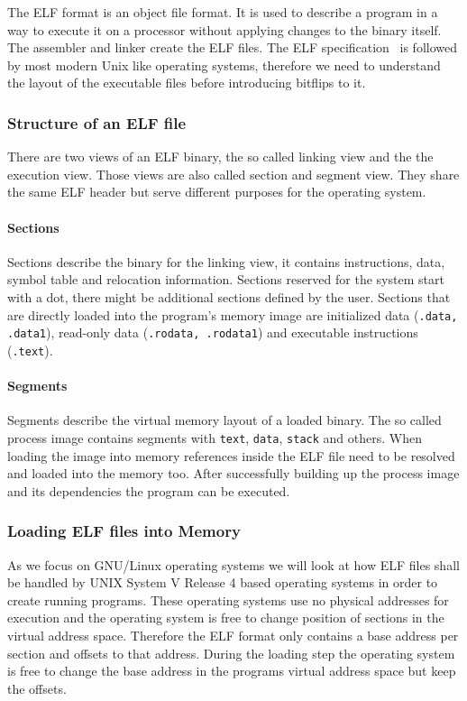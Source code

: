 The ELF format is an object file format. It is used to describe a program in a
way to execute it on a processor without applying changes to the binary itself.
The assembler and linker create the ELF files. The ELF
specification~\cite{elfspec} is followed by most modern Unix like operating
systems, therefore we need to understand the layout of the executable files
before introducing bitflips to it.

\subsubsection{Structure of an ELF file}

There are two views of an ELF binary, the so called linking view and the the 
execution view. Those views are also called section and segment view. They 
share the same ELF header but serve different purposes for the operating system.

\paragraph{Sections}

Sections describe the binary for the linking view, it contains instructions,
data, symbol table and relocation information. Sections reserved for the system
start with a dot, there might be additional sections defined by the user.
Sections that are directly loaded into the program's memory image are
initialized data (\texttt{.data, .data1}), read-only data (\texttt{.rodata,
.rodata1}) and executable instructions (\texttt{.text}).

\paragraph{Segments}

Segments describe the virtual memory layout of a loaded binary. The so called 
process image contains segments with \texttt{text}, \texttt{data}, 
\texttt{stack} and others. When loading the image into memory references inside 
the ELF file need to be resolved and loaded into the memory too. After 
successfully building up the process image and its dependencies the program can 
be executed.

\subsubsection{Loading ELF files into Memory}

As we focus on GNU/Linux operating systems we will look at how ELF files shall 
be handled by UNIX System V Release 4 based operating systems in order to 
create running programs.
These operating systems use no physical addresses for execution and the 
operating system is free to change position of sections in the virtual address 
space. Therefore the ELF format only contains a base address per section and 
offsets to that address. During the loading step the operating system is free 
to change the base address in the programs virtual address space but keep the 
offsets.

